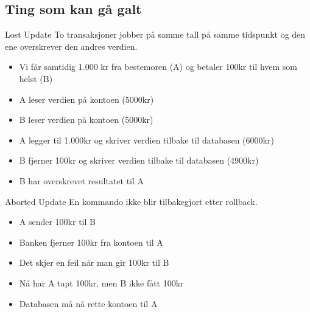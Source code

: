 \subsection*{Ting som kan gå galt}
\begin{frame}{}
    \begin{block}{Lost Update}
    To transaksjoner jobber på samme tall på samme tidspunkt og den ene overskrever den andres verdien.
    \end{block}
    \begin{itemize}
        \item Vi får samtidig 1.000 kr fra bestemoren (A) og betaler 100kr til hvem som helst (B)
        \item A leser verdien på kontoen (5000kr)
        \item B leser verdien på kontoen (5000kr)
        \item A legger til 1.000kr og skriver verdien tilbake til databasen (6000kr)
        \item B fjerner 100kr og skriver verdien tilbake til databasen (4900kr)
        \item B har overskrevet resultatet til A
    \end{itemize}
    
\end{frame}

\begin{frame}{}
    \begin{block}{Aborted Update}
    En kommando ikke blir tilbakegjort etter rollback.
    \end{block}
    \begin{itemize}
        \item A sender 100kr til B
        \item Banken fjerner 100kr fra kontoen til A
        \item Det skjer en feil når man gir 100kr til B
        \item Nå har A tapt 100kr, men B ikke fått 100kr
        \item Databasen må nå rette kontoen til A
    \end{itemize}
\end{frame}


